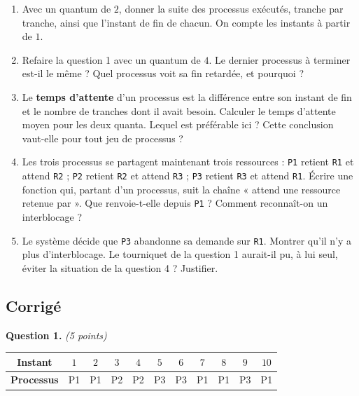 \begin{enumerate}
  \item Avec un quantum de $2$, donner la suite des processus exécutés, tranche
    par tranche, ainsi que l'instant de fin de chacun. On compte les instants à
    partir de $1$.

  \item Refaire la question 1 avec un quantum de $4$. Le dernier processus à
    terminer est-il le même ? Quel processus voit sa fin retardée, et pourquoi ?

  \item Le \textbf{temps d'attente} d'un processus est la différence entre son
    instant de fin et le nombre de tranches dont il avait besoin. Calculer le
    temps d'attente moyen pour les deux quanta. Lequel est préférable ici ?
    Cette conclusion vaut-elle pour tout jeu de processus ?

  \item Les trois processus se partagent maintenant trois ressources :
    \texttt{P1} retient \texttt{R1} et attend \texttt{R2} ; \texttt{P2} retient
    \texttt{R2} et attend \texttt{R3} ; \texttt{P3} retient \texttt{R3} et
    attend \texttt{R1}. Écrire une fonction qui, partant d'un processus, suit la
    chaîne « attend une ressource retenue par ». Que renvoie-t-elle depuis
    \texttt{P1} ? Comment reconnaît-on un interblocage ?

  \item Le système décide que \texttt{P3} abandonne sa demande sur \texttt{R1}.
    Montrer qu'il n'y a plus d'interblocage. Le tourniquet de la question 1
    aurait-il pu, à lui seul, éviter la situation de la question 4 ? Justifier.
\end{enumerate}

\subsection*{Corrigé}

\textbf{Question 1.} \emph{(5 points)}

\begin{center}
\begin{tabular}{|c|c|c|c|c|c|c|c|c|c|c|}
\hline
\textbf{Instant} & $1$ & $2$ & $3$ & $4$ & $5$ & $6$ & $7$ & $8$ & $9$ & $10$ \\
\hline
\textbf{Processus} & P1 & P1 & P2 & P2 & P3 & P3 & P1 & P1 & P3 & P1 \\
\hline
\end{tabular}
\end{center}

